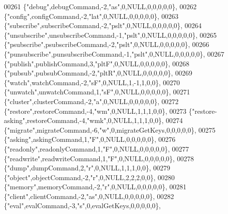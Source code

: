 \begin{DoxyCode}
00261     \{\textcolor{stringliteral}{"debug"},debugCommand,-2,\textcolor{stringliteral}{"as"},0,NULL,0,0,0,0,0\},
00262     \{\textcolor{stringliteral}{"config"},configCommand,-2,\textcolor{stringliteral}{"lat"},0,NULL,0,0,0,0,0\},
00263     \{\textcolor{stringliteral}{"subscribe"},subscribeCommand,-2,\textcolor{stringliteral}{"pslt"},0,NULL,0,0,0,0,0\},
00264     \{\textcolor{stringliteral}{"unsubscribe"},unsubscribeCommand,-1,\textcolor{stringliteral}{"pslt"},0,NULL,0,0,0,0,0\},
00265     \{\textcolor{stringliteral}{"psubscribe"},psubscribeCommand,-2,\textcolor{stringliteral}{"pslt"},0,NULL,0,0,0,0,0\},
00266     \{\textcolor{stringliteral}{"punsubscribe"},punsubscribeCommand,-1,\textcolor{stringliteral}{"pslt"},0,NULL,0,0,0,0,0\},
00267     \{\textcolor{stringliteral}{"publish"},publishCommand,3,\textcolor{stringliteral}{"pltF"},0,NULL,0,0,0,0,0\},
00268     \{\textcolor{stringliteral}{"pubsub"},pubsubCommand,-2,\textcolor{stringliteral}{"pltR"},0,NULL,0,0,0,0,0\},
00269     \{\textcolor{stringliteral}{"watch"},watchCommand,-2,\textcolor{stringliteral}{"sF"},0,NULL,1,-1,1,0,0\},
00270     \{\textcolor{stringliteral}{"unwatch"},unwatchCommand,1,\textcolor{stringliteral}{"sF"},0,NULL,0,0,0,0,0\},
00271     \{\textcolor{stringliteral}{"cluster"},clusterCommand,-2,\textcolor{stringliteral}{"a"},0,NULL,0,0,0,0,0\},
00272     \{\textcolor{stringliteral}{"restore"},restoreCommand,-4,\textcolor{stringliteral}{"wm"},0,NULL,1,1,1,0,0\},
00273     \{\textcolor{stringliteral}{"restore-asking"},restoreCommand,-4,\textcolor{stringliteral}{"wmk"},0,NULL,1,1,1,0,0\},
00274     \{\textcolor{stringliteral}{"migrate"},migrateCommand,-6,\textcolor{stringliteral}{"w"},0,migrateGetKeys,0,0,0,0,0\},
00275     \{\textcolor{stringliteral}{"asking"},askingCommand,1,\textcolor{stringliteral}{"F"},0,NULL,0,0,0,0,0\},
00276     \{\textcolor{stringliteral}{"readonly"},readonlyCommand,1,\textcolor{stringliteral}{"F"},0,NULL,0,0,0,0,0\},
00277     \{\textcolor{stringliteral}{"readwrite"},readwriteCommand,1,\textcolor{stringliteral}{"F"},0,NULL,0,0,0,0,0\},
00278     \{\textcolor{stringliteral}{"dump"},dumpCommand,2,\textcolor{stringliteral}{"r"},0,NULL,1,1,1,0,0\},
00279     \{\textcolor{stringliteral}{"object"},objectCommand,-2,\textcolor{stringliteral}{"r"},0,NULL,2,2,2,0,0\},
00280     \{\textcolor{stringliteral}{"memory"},memoryCommand,-2,\textcolor{stringliteral}{"r"},0,NULL,0,0,0,0,0\},
00281     \{\textcolor{stringliteral}{"client"},clientCommand,-2,\textcolor{stringliteral}{"as"},0,NULL,0,0,0,0,0\},
00282     \{\textcolor{stringliteral}{"eval"},evalCommand,-3,\textcolor{stringliteral}{"s"},0,evalGetKeys,0,0,0,0,0\},

\end{DoxyCode}
